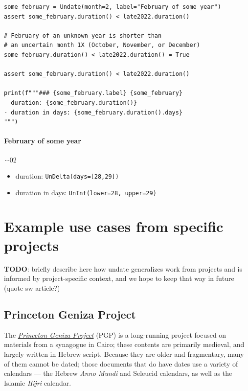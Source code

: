 \documentclass{anthology-ch}         %
\begin{document}
\begin{verbatim}
some_february = Undate(month=2, label="February of some year")
assert some_february.duration() < late2022.duration()

# February of an unknown year is shorter than 
# an uncertain month 1X (October, November, or December) 
some_february.duration() < late2022.duration() = True

assert some_february.duration() < late2022.duration()

print(f"""### {some_february.label} {some_february}
- duration: {some_february.duration()}
- duration in days: {some_february.duration().days}
""")

\end{verbatim}

\paragraph{February of some year} \texttt{-}{-02}
\begin{itemize}
    \item duration: \texttt{UnDelta(days=[28,29])}
    \item duration in days: \texttt{UnInt(lower=28, upper=29)}
\end{itemize}
    
\section{Example use cases from specific projects}\label{example-use-cases-from-specific-projects}


\textbf{TODO}: briefly describe here how undate generalizes work from projects and is informed by project-specific context, and we hope to keep that way in future (quote sw article?)

\subsection{Princeton Geniza Project}\label{princeton-geniza-project}

The \href{https://geniza.princeton.edu/}{\textit{Princeton Geniza Project}} (PGP) is
a long-running project focused on materials from a synagogue in Cairo; these contents are
primarily medieval, and largely written in Hebrew script. Because they are older and fragmentary, many of them cannot be dated;  those documents that do have dates use a variety of calendars — the Hebrew \textit{Anno Mundi} and Seleucid calendars, as well as the
Islamic \textit{Hijri} calendar. 
\end{document}
